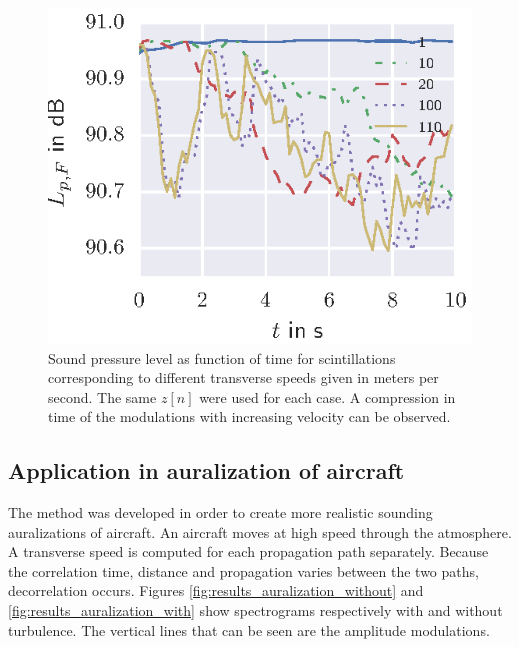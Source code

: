 \begin{figure}[H]
  \centering
  \includegraphics[]{../figures/manual/turbulence-model/scintillations_levels}
  \caption{Sound pressure level as function of time for scintillations
corresponding to different transverse speeds given in meters per second. The
same $z[n]$ were used for each case. A compression in time of the modulations with increasing velocity can be observed.}
  \label{fig:results_scintillations_levels}
\end{figure}


\subsection{Application in auralization of aircraft}
The method was developed in order to create more realistic sounding
auralizations of aircraft. An aircraft moves at high speed through the
atmosphere. A transverse speed is computed for each propagation path separately.
Because the correlation time, distance and propagation varies between the two
paths, decorrelation occurs. Figures \ref{fig:results_auralization_without} and
\ref{fig:results_auralization_with} show spectrograms respectively with and
without turbulence. The vertical lines that can be seen are the amplitude
modulations.


